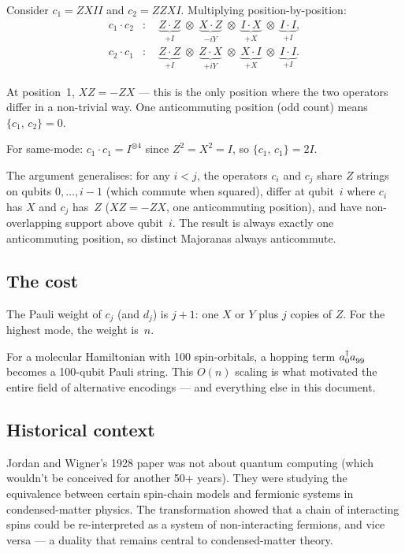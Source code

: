 \documentclass[11pt,a4paper]{article}
\newcommand{\ad}[1]{a_{#1}^{\dagger}}
\newcommand{\an}[1]{a_{#1}^{\vphantom{\dagger}}}
\newcommand{\acomm}[2]{\{#1,\,#2\}}
\theoremstyle{definition}
\begin{document}
Consider $c_1 = ZXII$ and $c_2 = ZZXI$.  Multiplying
position-by-position:
\begin{align*}
  c_1 \cdot c_2 &: \quad
    \underbrace{Z \cdot Z}_{+I} \;\otimes\;
    \underbrace{X \cdot Z}_{-iY} \;\otimes\;
    \underbrace{I \cdot X}_{+X} \;\otimes\;
    \underbrace{I \cdot I}_{+I}, \\
  c_2 \cdot c_1 &: \quad
    \underbrace{Z \cdot Z}_{+I} \;\otimes\;
    \underbrace{Z \cdot X}_{+iY} \;\otimes\;
    \underbrace{X \cdot I}_{+X} \;\otimes\;
    \underbrace{I \cdot I}_{+I}.
\end{align*}

At position~1, $XZ = -ZX$ --- this is the only position where the two
operators differ in a non-trivial way.  One anticommuting position
(odd count) means $\acomm{c_1}{c_2} = 0$. \checkmark

For same-mode: $c_1 \cdot c_1 = I^{\otimes 4}$ since $Z^2 = X^2 = I$,
so $\acomm{c_1}{c_1} = 2I$. \checkmark

The argument generalises: for any $i < j$, the operators $c_i$ and
$c_j$ share $Z$ strings on qubits $0, \ldots, i{-}1$ (which commute
when squared), differ at qubit~$i$ where $c_i$ has $X$ and $c_j$
has~$Z$ ($XZ = -ZX$, one anticommuting position), and have
non-overlapping support above qubit~$i$.  The result is always
exactly one anticommuting position, so distinct Majoranas always
anticommute.

\subsection*{The cost}

The Pauli weight of $c_j$ (and $d_j$) is $j + 1$: one $X$ or $Y$
plus $j$ copies of $Z$.  For the highest mode, the weight is~$n$.

For a molecular Hamiltonian with 100 spin-orbitals, a hopping term
$\ad{0}\an{99}$ becomes a 100-qubit Pauli string.  This $O(n)$
scaling is what motivated the entire field of alternative encodings ---
and everything else in this document.

\subsection*{Historical context}

Jordan and Wigner's 1928 paper was not about quantum computing
(which wouldn't be conceived for another 50+ years).  They were
studying the equivalence between certain spin-chain models and
fermionic systems in condensed-matter physics.  The transformation
showed that a chain of interacting spins could be re-interpreted as a
system of non-interacting fermions, and vice versa --- a duality that
remains central to condensed-matter theory.
\end{document}
